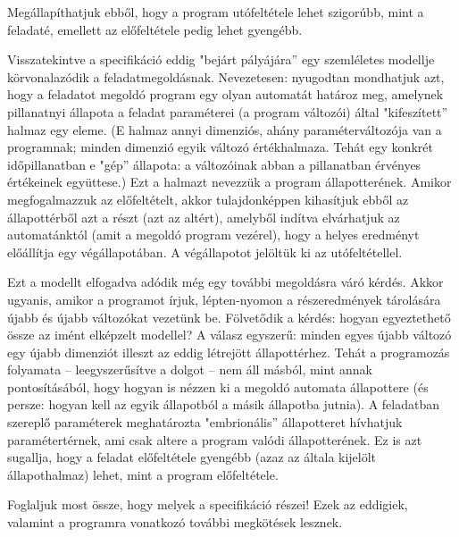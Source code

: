 \documentclass[margin=0px]{article}
\begin{document}
	Megállapíthatjuk ebből, hogy a program utófeltétele lehet szigorúbb, mint a feladaté, emellett az előfeltétele pedig lehet gyengébb.
	
	Visszatekintve a specifikáció eddig "bejárt pályájára” egy szemléletes modellje körvonalazódik a feladatmegoldásnak. Nevezetesen: nyugodtan mondhatjuk azt, hogy a feladatot megoldó program egy olyan automatát határoz meg, amelynek pillanatnyi állapota a feladat paraméterei (a program változói) által "kifeszített” halmaz egy eleme. (E halmaz annyi dimenziós, ahány paraméterváltozója van a programnak; minden dimenzió egyik változó értékhalmaza. Tehát egy konkrét időpillanatban e "gép” állapota: a változóinak abban a pillanatban érvényes értékeinek együttese.) Ezt a halmazt nevezzük a program állapotterének. Amikor megfogalmazzuk az előfeltételt, akkor tulajdonképpen kihasítjuk ebből az állapottérből azt a részt (azt az altért), amelyből indítva elvárhatjuk az automatánktól (amit a megoldó program vezérel), hogy a helyes eredményt előállítja egy végállapotában. A végállapotot jelöltük ki az utófeltétellel.
	
	Ezt a modellt elfogadva adódik még egy további megoldásra váró kérdés. Akkor ugyanis, amikor a programot írjuk, lépten-nyomon a részeredmények tárolására újabb és újabb változókat vezetünk be. Fölvetődik a kérdés: hogyan egyeztethető össze az imént elképzelt modellel? A válasz egyszerű: minden egyes újabb változó egy újabb dimenziót illeszt az eddig létrejött állapottérhez. Tehát a programozás folyamata – leegyszerűsítve a dolgot – nem áll másból, mint annak pontosításából, hogy hogyan is nézzen ki a megoldó automata állapottere (és persze: hogyan kell az egyik állapotból a másik állapotba jutnia). A feladatban szereplő paraméterek meghatározta "embrionális” állapotteret hívhatjuk paramétertérnek, ami csak altere a program valódi állapotterének. Ez is azt sugallja, hogy a feladat előfeltétele gyengébb (azaz az általa kijelölt állapothalmaz) lehet, mint a program előfeltétele. 
	
	Foglaljuk most össze, hogy melyek a specifikáció részei! Ezek az eddigiek, valamint a programra vonatkozó további megkötések lesznek.
	
\end{document}

